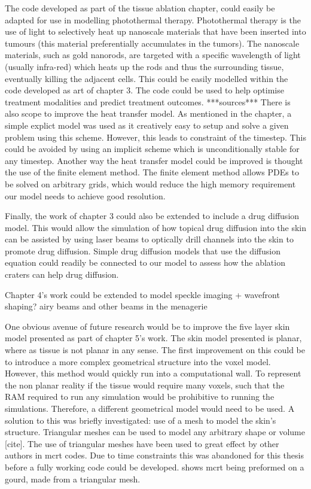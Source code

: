The code developed as part of the tissue ablation chapter, could easily be adapted for use in modelling photothermal therapy.
Photothermal therapy is the use of light to selectively heat up nanoscale materials that have been inserted into tumours (this material preferentially accumulates in the tumors).
The nanoscale materials, such as gold nanorods, are targeted with a specific wavelength of light (usually infra-red) which heats up the rods and thus the surrounding tissue, eventually killing the adjacent cells.
This could be easily modelled within the code developed as art of chapter 3.
The code could be used to help optimise treatment modalities and predict treatment outcomes. ***sources***
There is also scope to improve the heat transfer model.
As mentioned in the chapter, a simple explict model was used as it creatively easy to setup and solve a given problem using this scheme.
However, this leads to constraint of the timestep.
This could be avoided by using an implicit scheme which is unconditionally stable for any timestep.
Another way the heat transfer model could be improved is thought the use of the finite element method.
The finite element method allows PDEs to be solved on arbitrary grids, which would reduce the high memory requirement our model needs to achieve good resolution.

Finally, the work of chapter 3 could also be extended to include a drug diffusion model.
This would allow the simulation of how topical drug diffusion into the skin can be assisted by using laser beams to optically drill channels into the skin to promote drug diffusion.
Simple drug diffusion models that use the diffusion equation could readily be connected to our model to assess how the ablation craters can help drug diffusion.

\medskip

Chapter 4's work could be extended to model speckle imaging + wavefront shaping?
airy beams and other beams in the menagerie

\medskip

One obvious avenue of future research would be to improve the five layer skin model presented as part of chapter 5's work.
The skin model presented is planar, where as tissue is not planar in any sense.
The first improvement on this could be to introduce a more complex geometrical structure into the voxel model.
However, this method would quickly run into a computational wall.
To represent the non planar reality if the tissue would require many voxels, such that the RAM required to run any simulation would be prohibitive to running the simulations.
Therefore, a different geometrical model would need to be used.
A solution to this was briefly investigated: use of a mesh to model the skin's structure.
Triangular meshes can be used to model any arbitrary shape or volume [cite].
The use of triangular meshes have been used to great effect by other authors in \gls*{mcrt} codes.
Due to time constraints this was abandoned for this thesis before a fully working code could be developed.
 shows \gls*{mcrt} being preformed on a gourd, made from a triangular mesh.

